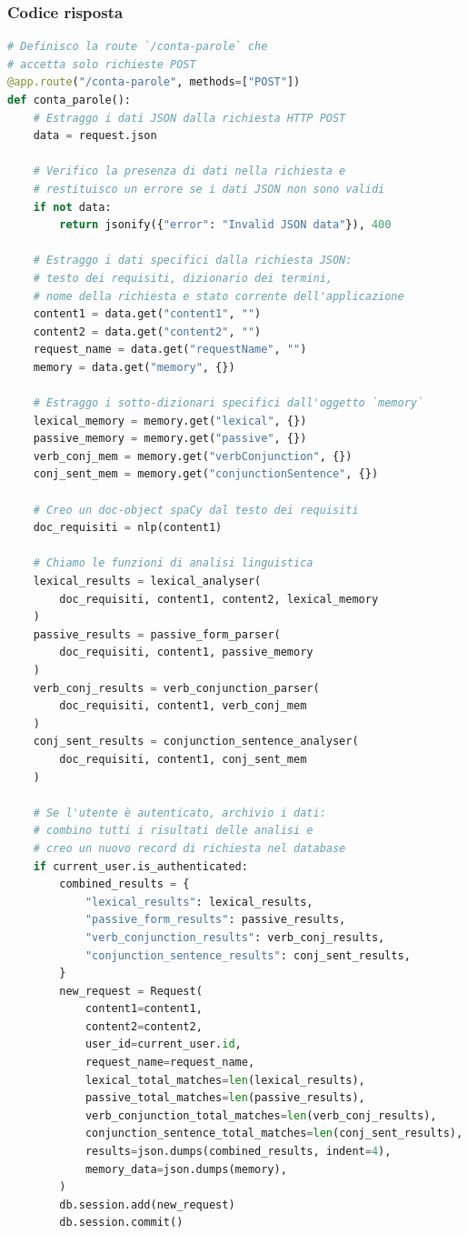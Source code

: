 \documentclass[12pt]{report}
\begin{document}
\subsubsection{Codice risposta}
\begin{lstlisting}[language=Python]
# Definisco la route `/conta-parole` che
# accetta solo richieste POST
@app.route("/conta-parole", methods=["POST"])
def conta_parole():
    # Estraggo i dati JSON dalla richiesta HTTP POST
    data = request.json

    # Verifico la presenza di dati nella richiesta e
    # restituisco un errore se i dati JSON non sono validi
    if not data:
        return jsonify({"error": "Invalid JSON data"}), 400

    # Estraggo i dati specifici dalla richiesta JSON:
    # testo dei requisiti, dizionario dei termini,
    # nome della richiesta e stato corrente dell'applicazione
    content1 = data.get("content1", "")
    content2 = data.get("content2", "")
    request_name = data.get("requestName", "")
    memory = data.get("memory", {})

    # Estraggo i sotto-dizionari specifici dall'oggetto `memory`
    lexical_memory = memory.get("lexical", {})
    passive_memory = memory.get("passive", {})
    verb_conj_mem = memory.get("verbConjunction", {})
    conj_sent_mem = memory.get("conjunctionSentence", {})

    # Creo un doc-object spaCy dal testo dei requisiti
    doc_requisiti = nlp(content1)

    # Chiamo le funzioni di analisi linguistica
    lexical_results = lexical_analyser(
        doc_requisiti, content1, content2, lexical_memory
    )
    passive_results = passive_form_parser(
        doc_requisiti, content1, passive_memory
    )
    verb_conj_results = verb_conjunction_parser(
        doc_requisiti, content1, verb_conj_mem
    )
    conj_sent_results = conjunction_sentence_analyser(
        doc_requisiti, content1, conj_sent_mem
    )

    # Se l'utente è autenticato, archivio i dati:
    # combino tutti i risultati delle analisi e
    # creo un nuovo record di richiesta nel database
    if current_user.is_authenticated:
        combined_results = {
            "lexical_results": lexical_results,
            "passive_form_results": passive_results,
            "verb_conjunction_results": verb_conj_results,
            "conjunction_sentence_results": conj_sent_results,
        }
        new_request = Request(
            content1=content1,
            content2=content2,
            user_id=current_user.id,
            request_name=request_name,
            lexical_total_matches=len(lexical_results),
            passive_total_matches=len(passive_results),
            verb_conjunction_total_matches=len(verb_conj_results),
            conjunction_sentence_total_matches=len(conj_sent_results),
            results=json.dumps(combined_results, indent=4),
            memory_data=json.dumps(memory),
        )
        db.session.add(new_request)
        db.session.commit()


\end{lstlisting}
\end{document}
